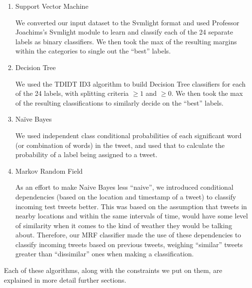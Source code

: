 \begin{enumerate}
\item Support Vector Machine

We converted our input dataset to the Svmlight format and used Professor Joachims’s Svmlight module to learn and classify each of the 24 separate labels as binary classifiers. We then took the max of the resulting margins within the categories to single out the “best” labels.

\item Decision Tree

We used the TDIDT ID3 algorithm to build Decision Tree classifiers for each of the 24 labels, with splitting criteria $\ge 1$ and $\ge 0$. We then took the max of the resulting classifications to similarly decide on the “best” labels.

\item Naïve Bayes

We used independent class conditional probabilities of each significant word (or combination of words) in the tweet, and used that to calculate the probability of a label being assigned to a tweet.

\item Markov Random Field

	As an effort to make Naive Bayes less ``naive'', we introduced conditional dependencies (based on the location and timestamp of a tweet) to classify incoming test tweets better. This was based on the assumption that tweets in nearby locations and within the same intervals of time, would have some level of similarity when it comes to the kind of weather they would be talking about. Therefore, our MRF classifier made the use of these dependencies to classify incoming tweets based on previous tweets, weighing ``similar'' tweets greater than ``dissimilar'' ones when making a classification.
\end{enumerate}

	Each of these algorithms, along with the constraints we put on them, are explained in more detail further sections.

